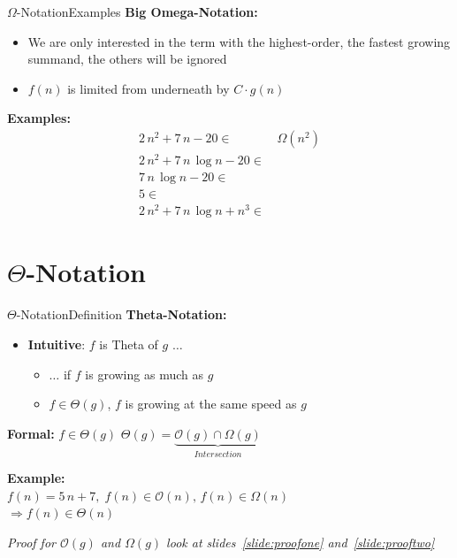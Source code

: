 \begin{frame}{$\Omega$-Notation}{Examples}
  \textbf{Big Omega-Notation:}
  \begin{itemize}
    \item
      We are only interested in the term with the highest-order,
      the fastest growing summand, the others will be ignored
    \item
      $f(n)$ is limited {\color{Mittel-Blau}from underneath} by
      $C \cdot g(n)$
  \end{itemize}
  \textbf{Examples:}
  \begin{align*}
    2 \, n^2 + 7 \, n - 20 \in & \,\Omega(n^2)\\
    2 \, n^2 + 7 \, n \, \log n - 20 \in & {}\\
    7 \, n \, \log n - 20 \in & {}\\
    5 \in & {}\\
    2 \, n^2 + 7 \, n \, \log n + n^3 \in & {}
  \end{align*}
\end{frame}


\section{\texorpdfstring{$\Theta$}{Theta}-Notation}

\begin{frame}{$\Theta$-Notation}{Definition}
  \textbf{Theta-Notation:}
  \begin{itemize}
    \item
      \textbf{Intuitive}: $f$ is Theta of $g$ $\ldots$
      \begin{itemize}
        \item
          $\ldots$ if $f$ is growing as much as $g$
        \item
          $f \in \Theta(g)$, $f$ is growing at the same speed as $g$
       \end{itemize}
  \end{itemize}
  \begin{block}{\textbf{Formal:} $f \in \Theta(g)$}
    $\Theta(g) = \underbrace{\mathcal O(g) \cap \Omega(g)}_{Intersection}$
  \end{block}
  \textbf{Example:}\\
  \hspace*{1.5em}$f(n) = 5 \, n + 7, \;
    f(n) \in \mathcal{O}(n), \,
    f(n) \in \Omega(n)$\\
  \hspace*{3.0em}$\Rightarrow f(n) \in \Theta(n)$\\[0.5em]
  \begin{center}
   \textit{Proof for $\mathcal{O}(g)$ and $\Omega(g)$ look at
     slides~\ref{slide:proofone} and~\ref{slide:prooftwo}}
  \end{center}
\end{frame}


